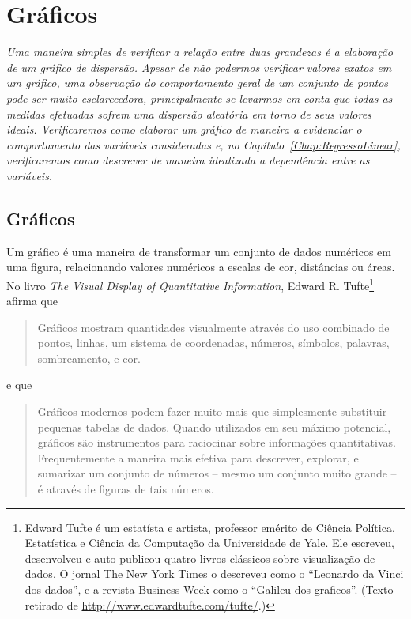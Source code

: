 \chapter{Gráficos}
\label{Chap:Graficos}

{\it
Uma maneira simples de verificar a relação entre duas grandezas é a elaboração de um gráfico de dispersão. Apesar de não podermos verificar valores exatos em um gráfico, uma observação do comportamento geral de um conjunto de pontos pode ser muito esclarecedora, principalmente se levarmos em conta que todas as medidas efetuadas sofrem uma dispersão aleatória em torno de seus valores ideais. Verificaremos como elaborar um gráfico de maneira a evidenciar o comportamento das variáveis consideradas e, no Capítulo~\ref{Chap:RegressoLinear}, verificaremos como descrever de maneira idealizada a dependência entre as variáveis.
}

\section{Gráficos}

Um gráfico é uma maneira de transformar um conjunto de dados numéricos em uma figura, relacionando valores numéricos a escalas de cor, distâncias ou áreas. No livro \emph{The Visual Display of Quantitative Information}\cite{Tufte2001}, Edward R. Tufte\footnote{
Edward Tufte é um estatísta e artista, professor emérito de Ciência Política, Estatística e Ciência da Computação da Universidade de Yale. Ele escreveu, desenvolveu e auto-publicou quatro livros clássicos sobre visualização de dados. O jornal The New York Times o descreveu como o ``Leonardo da Vinci dos dados'', e a revista Business Week como o ``Galileu dos graficos''. (Texto retirado de \url{http://www.edwardtufte.com/tufte/}.)}
afirma que
\begin{quote}
	Gráficos mostram quantidades visualmente através do uso combinado de pontos, linhas, um sistema de coordenadas, números, símbolos, palavras, sombreamento, e cor.
\end{quote}
%
e que
\begin{quote}
	Gráficos modernos podem fazer muito mais que simplesmente substituir pequenas tabelas de dados. Quando utilizados em seu máximo potencial, gráficos são instrumentos para raciocinar sobre informações quantitativas. Frequentemente a maneira mais efetiva para descrever, explorar, e sumarizar um conjunto de números -- mesmo um conjunto muito grande -- é através de figuras de tais números.
\end{quote}

